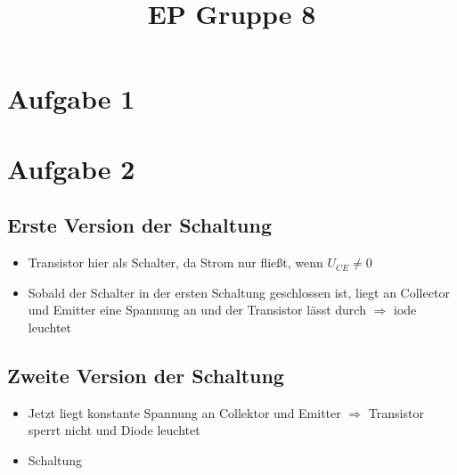 \documentclass[compress,11pt]{beamer}
\title{EP Gruppe 8}
\begin{document}
\section{Aufgabe 1}
\begin{frame}

\end{frame}


\section{Aufgabe 2}
\begin{frame}
\subsection{Erste Version der Schaltung}
\begin{itemize}
\item Transistor hier als Schalter, da Strom nur fließt, wenn $U_{CE} \neq 0$
\item Sobald der Schalter in der ersten Schaltung geschlossen ist, liegt an Collector und Emitter eine Spannung an und der Transistor lässt durch $\Rightarrow$ iode leuchtet
\end{itemize}
\subsection{Zweite Version der Schaltung}
\begin{itemize}
\item Jetzt liegt konstante Spannung an Collektor und Emitter $\Rightarrow$ Transistor sperrt nicht und Diode leuchtet
\item Schaltung
\end{itemize}
\end{frame}
\end{document}
